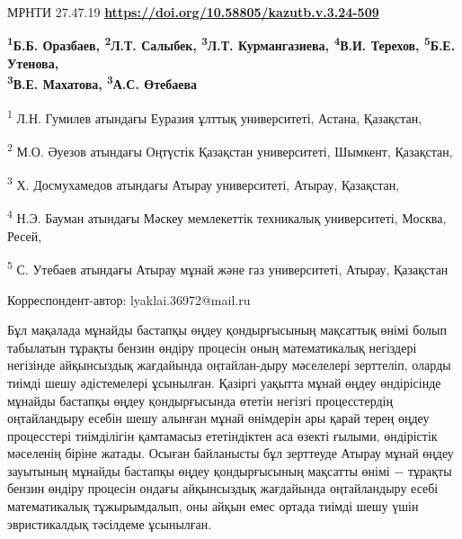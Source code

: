 \newpage
МРНТИ 27.47.19
\hfill {\bfseries \href{https://doi.org/10.58805/kazutb.v.3.24-509}{https://doi.org/10.58805/kazutb.v.3.24-509}}


\begin{center}
{\bfseries \textsuperscript{1}Б.Б. Оразбаев, \textsuperscript{2}Л.Т.
Салыбек\envelope, \textsuperscript{3}Л.Т. Курмангазиева,
\textsuperscript{4}В.И. Терехов, \textsuperscript{5}Б.Е. Утенова, 
\\\textsuperscript{3}В.Е. Махатова, \textsuperscript{3}А.С.
Өтебаева}

\textsuperscript{1} Л.Н. Гумилев атындағы Еуразия ұлттық университеті,
Астана, Қазақстан,

\textsuperscript{2} М.О. Әуезов атындағы Оңтүстік Қазақстан
университеті, Шымкент, Қазақстан,

\textsuperscript{3} Х. Досмухамедов атындағы Атырау университеті,
Атырау, Қазақстан,

\textsuperscript{4} Н.Э. Бауман атындағы Мәскеу мемлекеттік техникалық
университеті, Москва, Ресей,

\textsuperscript{5} С. Утебаев атындағы Атырау мұнай
және газ университеті, Атырау, Қазақстан
\end{center}
\envelope Корреспондент-автор: lyaklai.36972@mail.ru \vspace{0.5cm}

Бұл мақалада мұнайды бастапқы өңдеу қондырғысының мақсаттық өнімі болып
табылатын тұрақты бензин өндіру процесін оның математикалық негіздері
негізінде айқынсыздық жағдайында оңтайлан-дыру мәселелері зерттеліп,
оларды тиімді шешу әдістемелері ұсынылған. Қазіргі уақытта мұнай өңдеу
өндірісінде мұнайды бастапқы өңдеу қондырғысында өтетін негізгі
процесстердің оңтайландыру есебін шешу алынған мұнай өнімдерін ары
қарай терең өңдеу процесстері тиімділігін қамтамасыз ететіндіктен аса
өзекті ғылыми, өндірістік мәселенің біріне жатады. Осыған байланысты бұл
зерттеуде Атырау мұнай өңдеу зауытының мұнайды бастапқы өңдеу
қондырғысының мақсатты өнімі − тұрақты бензин өндіру процесін ондағы
айқынсыздық жағдайында оңтайландыру есебі математикалық тұжырымдалып,
оны айқын емес ортада тиімді шешу үшін эвристикалдық тәсілдеме
ұсынылған.

